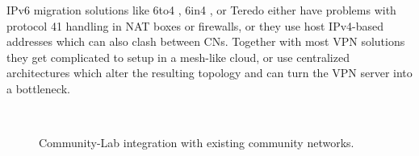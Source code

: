\documentclass[conference]{IEEEtran}
\begin{document}

IPv6 migration solutions like 6to4 \cite{6to4}, 6in4 \cite{6in4},
or Teredo \cite{teredo} either have problems with protocol 41
handling in NAT boxes or firewalls, or they use host IPv4-based addresses which can
also clash between CNs.  Together with most VPN solutions they get complicated to
setup in a mesh-like cloud, or use centralized architectures which alter the
resulting topology and can turn the VPN server into a bottleneck.


\begin{figure}[!t]
 \centering
 \\
 \caption{Community-Lab integration with existing community networks.}
\end{figure}
\end{document}
